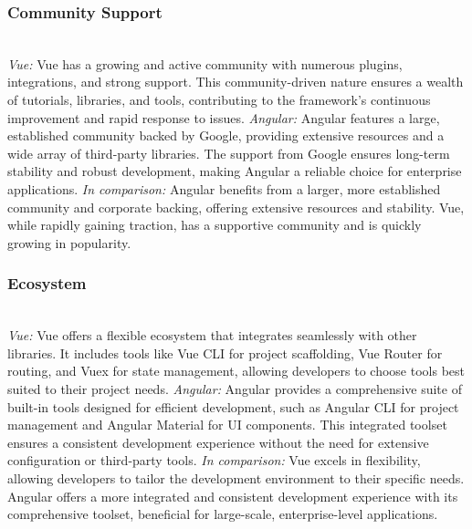 \documentclass[conference]{IEEEtran}
\begin{document}
\subsubsection{Community Support}
\textit{\\Vue:} Vue has a growing and active community with numerous plugins, integrations, and strong support. This community-driven nature ensures a wealth of tutorials, libraries, and tools, contributing to the framework’s continuous improvement and rapid response to issues.
\newline\textit{Angular:} Angular features a large, established community backed by Google, providing extensive resources and a wide array of third-party libraries. The support from Google ensures long-term stability and robust development, making Angular a reliable choice for enterprise applications.
\newline\textit{In comparison:} Angular benefits from a larger, more established community and corporate backing, offering extensive resources and stability. Vue, while rapidly gaining traction, has a supportive community and is quickly growing in popularity.
\newline
\subsubsection{Ecosystem}
\textit{\\Vue:} Vue offers a flexible ecosystem that integrates seamlessly with other libraries. It includes tools like Vue CLI for project scaffolding, Vue Router for routing, and Vuex for state management, allowing developers to choose tools best suited to their project needs.
\newline\textit{Angular:} Angular provides a comprehensive suite of built-in tools designed for efficient development, such as Angular CLI for project management and Angular Material for UI components. This integrated toolset ensures a consistent development experience without the need for extensive configuration or third-party tools.
\newline\textit{In comparison:} Vue excels in flexibility, allowing developers to tailor the development environment to their specific needs. Angular offers a more integrated and consistent development experience with its comprehensive toolset, beneficial for large-scale, enterprise-level applications.
\newline
\end{document}
